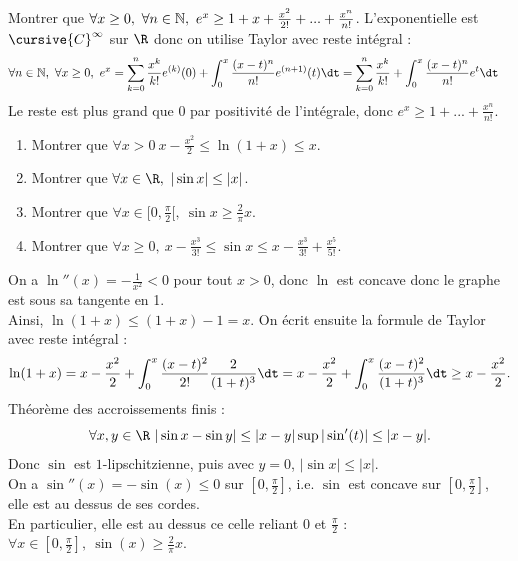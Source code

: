 \documentclass[11pt]{article}
\begin{document}
\begin{exercice}{}{}
    Montrer que $\forall x \geq 0, ~ \forall n \in \mathbb{N}, ~ e^x \geq 1 + x + \frac{x^2}{2!} + ... + \frac{x^n}{n!}$.
    \tcblower
    L'exponentielle est $\cursive{C}^{\infty}$ sur $\R$ donc on utilise Taylor avec reste intégral :
    \begin{align*}
        \forall n \in \N, ~ \forall x \geq 0, ~ e^x &= \sum_{k=0}^n \frac{x^k}{k!}e^{(k)}(0) + \int_0^x\frac{(x-t)^n}{n!}e^{(n+1)}(t)\dt= \sum_{k=0}^n\frac{x^k}{k!} + \int_0^x\frac{(x-t)^n}{n!}e^t\dt
    \end{align*}
    Le reste est plus grand que 0 par positivité de l'intégrale, donc $e^x \geq 1 + ... + \frac{x^n}{n!}$.
\end{exercice}

\begin{exercice}{}{}
    \begin{enumerate}
        \item Montrer que $\forall x > 0 ~ x-\frac{x^2}{2}\leq\ln(1+x)\leq x$.
        \item Montrer que $\forall x \in \R, ~ |\sin x| \leq |x|$.
        \item Montrer que $\forall x \in [0,\frac{\pi}{2}[, ~ \sin x \geq \frac{2}{\pi}x$.
        \item Montrer que $\forall x \geq 0, ~ x - \frac{x^3}{3!} \leq \sin x \leq x - \frac{x^3}{3!} + \frac{x^5}{5!}$.
    \end{enumerate}
    \tcblower
     On a $\ln''(x)=-\frac{1}{x^2}<0$ pour tout $x>0$, donc $\ln$ est concave donc le graphe est sous sa tangente en 1.\\
    Ainsi, $\ln(1+x)\leq (1+x) - 1 = x$. On écrit ensuite la formule de Taylor avec reste intégral :
    \begin{equation*}
        \ln(1+x) = x - \frac{x^2}{2} + \int_0^x \frac{(x-t)^2}{2!}\frac{2}{(1+t)^3}\dt=x-\frac{x^2}{2}+\int_0^x\frac{(x-t)^2}{(1+t)^3}\dt\geq x-\frac{x^2}{2}.
    \end{equation*}
     Théorème des accroissements finis :
    \begin{equation*}
        \forall x,y \in \R ~ |\sin x - \sin y| \leq |x-y|\sup|\sin'(t)| \leq |x-y|.
    \end{equation*}
    Donc $\sin$ est $1$-lipschitzienne, puis avec $y=0$, $|\sin x| \leq |x|$.\\
     On a $\sin''(x)=-\sin(x)\leq0$ sur $[0,\frac{\pi}{2}]$, i.e. $\sin$ est concave sur $[0,\frac{\pi}{2}]$, elle est au dessus de ses cordes.\\
    En particulier, elle est au dessus ce celle reliant $0$ et $\frac{\pi}{2}$ : $\forall x \in [0,\frac{\pi}{2}], ~ \sin(x)\geq\frac{2}{\pi}x$.\\
\end{exercice}
\end{document}
